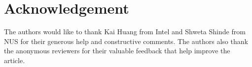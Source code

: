 \section*{Acknowledgement}
The authors would like to thank Kai Huang from Intel and Shweta Shinde from NUS for their generous help and constructive comments. The authors also thank the anonymous reviewers for their valuable feedback that help improve the article. 

